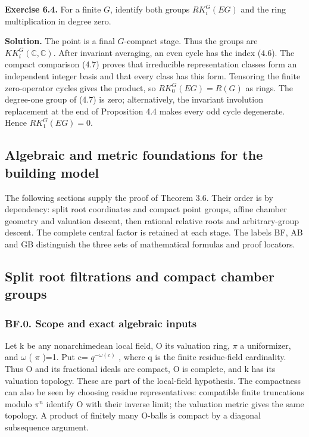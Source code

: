 \documentclass[
  11pt,
]{article}
\begin{document}
\textbf{Exercise 6.4.} For a finite \(G\), identify both groups
\(RK_i^G(EG)\) and the ring multiplication in degree zero.

\textbf{Solution.} The point is a final \(G\)-compact stage. Thus the
groups are \(KK_i^G(\mathbb C,\mathbb C)\). After invariant averaging,
an even cycle has the index (4.6). The compact comparison (4.7) proves
that irreducible representation classes form an independent integer
basis and that every class has this form. Tensoring the finite
zero-operator cycles gives the product, so \(RK_0^G(EG)=R(G)\) as rings.
The degree-one group of (4.7) is zero; alternatively, the invariant
involution replacement at the end of Proposition 4.4 makes every odd
cycle degenerate. Hence \(RK_1^G(EG)=0\).

\subsection{Algebraic and metric foundations for the building
model}\label{algebraic-and-metric-foundations-for-the-building-model}

The following sections supply the proof of Theorem 3.6. Their order is
by dependency: split root coordinates and compact point groups, affine
chamber geometry and valuation descent, then rational relative roots and
arbitrary-group descent. The complete central factor is retained at each
stage. The labels BF, AB and GB distinguish the three sets of
mathematical formulas and proof locators.

\subsection{Split root filtrations and compact chamber
groups}\label{split-root-filtrations-and-compact-chamber-groups}

\subsubsection{BF.0. Scope and exact algebraic
inputs}\label{bf.0.-scope-and-exact-algebraic-inputs}

Let k be any nonarchimedean local field, O its valuation ring, \(\pi\) a
uniformizer, and \(\omega\) ( \(\pi\) )=1. Put \textbar c\textbar=
\(q^{-\omega(c)}\) , where q is the finite residue-field cardinality.
Thus O and its fractional ideals are compact, O is complete, and k has
its valuation topology. These are part of the local-field hypothesis.
The compactness can also be seen by choosing residue representatives:
compatible finite truncations modulo \(\pi^n\) identify O with their
inverse limit; the valuation metric gives the same topology. A product
of finitely many O-balls is compact by a diagonal subsequence argument.
\end{document}
